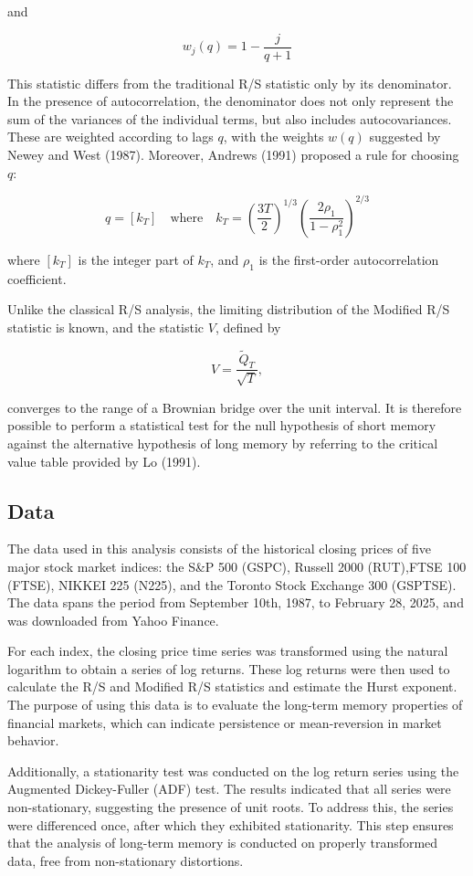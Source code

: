 \documentclass[11pt]{extarticle}
\begin{document}
and

\[
w_j(q) = 1 - \frac{j}{q + 1}
\]

This statistic differs from the traditional R/S statistic only by its denominator. In the presence of autocorrelation, the denominator does not only represent the sum of the variances of the individual terms, but also includes autocovariances.
These are weighted according to lags $q$, with the weights $w(q)$ suggested by Newey and West (1987). Moreover, Andrews (1991) proposed a rule for choosing $q$:

\[
q = \left[ k_T \right] \quad \text{where} \quad k_T = \left( \frac{3T}{2} \right)^{1/3} \left( \frac{2 \rho_1}{1 - \rho_1^2} \right)^{2/3}
\]

where $[k_T]$ is the integer part of $k_T$, and $\rho_1$ is the first-order autocorrelation coefficient.

Unlike the classical R/S analysis, the limiting distribution of the Modified R/S statistic is known, and the statistic $V$, defined by

\[
V = \frac{\tilde{Q}_T}{\sqrt{T}},
\]

converges to the range of a Brownian bridge over the unit interval. It is therefore possible to perform a statistical test for the null hypothesis of short memory against the alternative hypothesis of long memory by referring to the critical value table provided by Lo (1991).

\subsection{Data}

The data used in this analysis consists of the historical closing prices of five major stock market indices: the S\&P 500 (GSPC), Russell 2000 (RUT),FTSE 100 (FTSE), NIKKEI 225 (N225), and the Toronto Stock Exchange 300 (GSPTSE).
The data spans the period from September 10th, 1987, to February 28, 2025, and was downloaded from Yahoo Finance.

For each index, the closing price time series was transformed using the natural logarithm to obtain a series of log returns.
These log returns were then used to calculate the R/S and Modified R/S statistics and estimate the Hurst exponent.
The purpose of using this data is to evaluate the long-term memory properties of financial markets, which can indicate persistence or mean-reversion in market behavior.

Additionally, a stationarity test was conducted on the log return series using the Augmented Dickey-Fuller (ADF) test.
The results indicated that all series were non-stationary, suggesting the presence of unit roots. To address this, the series were differenced once, after which they exhibited stationarity.
This step ensures that the analysis of long-term memory is conducted on properly transformed data, free from non-stationary distortions.
\end{document}
